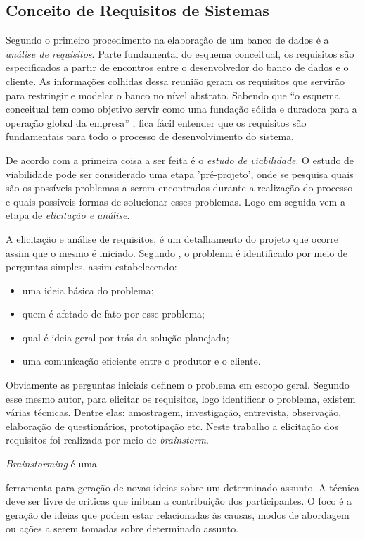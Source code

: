 \subsection{Conceito de Requisitos de Sistemas} \label{conceitos_requisitos}
Segundo  o primeiro procedimento na elaboração de um banco de dados é a \textit{análise de requisitos}. Parte fundamental do esquema conceitual, os requisitos são especificados a partir de encontros entre o desenvolvedor do banco de dados e o cliente. As informações colhidas dessa reunião geram os requisitos que servirão para restringir e modelar o banco no nível abstrato. Sabendo que ``o esquema conceitual tem como objetivo servir como uma fundação sólida e duradora para a operação global da empresa'' \cite[p.425]{date2011sql}, fica fácil entender que os requisitos são fundamentais para todo o processo de desenvolvimento do sistema.  

De acordo com  a primeira coisa a ser feita é o \textit{estudo de viabilidade}.
O estudo de viabilidade pode ser considerado uma etapa 'pré-projeto', onde se pesquisa quais são os possíveis problemas a serem encontrados durante a realização do processo e quais possíveis formas de solucionar esses problemas. Logo em seguida vem a etapa de \textit{elicitação e análise}.

A elicitação e análise de requisitos, é um detalhamento do projeto que ocorre assim que o mesmo é iniciado. Segundo , o problema é identificado por meio de perguntas simples, assim estabelecendo: 
\begin{itemize}
    \item uma ideia básica do problema;
    \item quem é afetado de fato por esse problema;
    \item qual é ideia geral por trás da solução planejada;
    \item uma comunicação eficiente entre o produtor e o cliente.
\end{itemize}
Obviamente as perguntas iniciais definem o problema em escopo geral. Segundo esse mesmo autor, para elicitar os requisitos, logo identificar o problema, existem várias técnicas. Dentre elas: amostragem, investigação, entrevista, observação, elaboração de questionários, prototipação etc. 
Neste trabalho a elicitação dos requisitos foi realizada por meio de \textit{brainstorm}.

\textit{Brainstorming} é uma
\begin{citacao}
 ferramenta para geração de novas ideias sobre um determinado assunto. A técnica deve ser livre de críticas que inibam a contribuição dos participantes. O foco é a geração de ideias que podem estar relacionadas às causas, modos de abordagem ou ações a serem tomadas sobre determinado assunto.\cite[p.7]{subplan2014}
\end{citacao}

